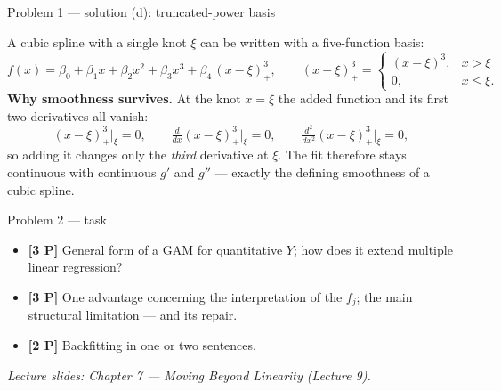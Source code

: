 \documentclass[aspectratio=169,11pt]{beamer}
\begin{document}
\begin{frame}{Problem 1 --- solution (d): truncated-power basis}
  \begin{solutionbox}
    A cubic spline with a single knot $\xi$ can be written with a five-function basis:
    \[
      f(x)=\beta_0+\beta_1x+\beta_2x^2+\beta_3x^3+\beta_4\,(x-\xi)^3_+,
      \qquad
      (x-\xi)^3_+=\begin{cases}(x-\xi)^3,& x>\xi\\[0.5mm] 0,& x\le\xi.\end{cases}
    \]
    \textbf{Why smoothness survives.} At the knot $x=\xi$ the added function and its first two
    derivatives all vanish:
    \[
      (x-\xi)^3_+\big|_{\xi}=0,\qquad
      \tfrac{d}{dx}(x-\xi)^3_+\big|_{\xi}=0,\qquad
      \tfrac{d^2}{dx^2}(x-\xi)^3_+\big|_{\xi}=0,
    \]
    so adding it changes only the \emph{third} derivative at $\xi$. The fit therefore stays
    continuous with continuous $g'$ and $g''$ --- exactly the defining smoothness of a cubic spline.
  \end{solutionbox}
\end{frame}

\begin{frame}{Problem 2 --- task}
  \begin{exercise}
    \begin{itemize}
      \item[(a)] \textbf{[3 P]} General form of a GAM for quantitative $Y$; how does it extend
        multiple linear regression?
      \item[(b)] \textbf{[3 P]} One advantage concerning the interpretation of the $f_j$;
        the main structural limitation --- and its repair.
      \item[(c)] \textbf{[2 P]} Backfitting in one or two sentences.
    \end{itemize}
  \end{exercise}
  {\scriptsize\itshape Lecture slides: Chapter 7 --- Moving Beyond Linearity (Lecture 9).}
\end{frame}
\end{document}
